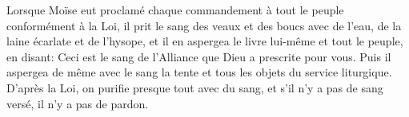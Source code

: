 Lorsque Moïse eut proclamé chaque commandement à tout le peuple
		conformément à la Loi,
	il prit le sang des veaux et des boucs avec de l’eau,
	de la laine écarlate et de l’hysope,
	et il en aspergea le livre lui-même et tout le peuple,
	en disant: Ceci est le sang de l’Alliance que Dieu a prescrite pour vous.
Puis il aspergea de même avec le sang
	la tente et tous les objets du service liturgique.
D’après la Loi, on purifie presque tout avec du sang,
	et s’il n’y a pas de sang versé, il n’y a pas de pardon.